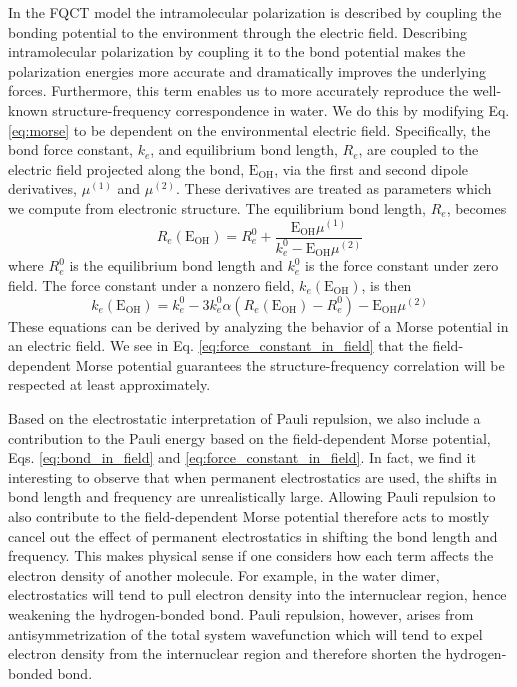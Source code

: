 \documentclass[journal=jctcce,manuscript=article]{achemso}
\begin{document}
In the FQCT model the intramolecular polarization is described by coupling the bonding potential to the environment through the electric field. Describing intramolecular polarization by coupling it to the bond potential makes the polarization energies more accurate and dramatically improves the underlying forces. Furthermore, this term enables us to more accurately reproduce the well-known structure-frequency correspondence in water.\cite{boyer2019beyond} We do this by modifying Eq. \ref{eq:morse} to be dependent on the environmental electric field. Specifically, the bond force constant, $k_e$, and equilibrium bond length, $R_e$, are coupled to the electric field projected along the bond, $\mathrm{E_{OH}}$, via the first and second dipole derivatives, $\mu^{(1)}$ and $\mu^{(2)}$. These derivatives are treated as parameters which we compute from electronic structure. The equilibrium bond length, $R_e$, becomes
\begin{equation}
  R_e(\mathrm{E_{OH}})=R_e^0+ \frac{\mathrm{E_{OH}}\mu^{(1)}}{k_e^0-\mathrm{E_{OH}}\mu^{(2)}}
  \label{eq:bond_in_field}
\end{equation}
where $R_e^0$ is the equilibrium bond length and $k_e^0$ is the force constant under zero field. The force constant under a nonzero field, $k_e(\mathrm{E_{OH}})$, is then
\begin{equation}
  k_e(\mathrm{E_{OH}})=k_e^0-3k_e^0\alpha\left(R_e(\mathrm{E_{OH}})-R_e^0\right)-\mathrm{E_{OH}}\mu^{(2)}
  \label{eq:force_constant_in_field}
\end{equation}
These equations can be derived by analyzing the behavior of a Morse potential in an electric field.\cite{boyer2019beyond} We see in Eq. \ref{eq:force_constant_in_field} that the field-dependent Morse potential guarantees the structure-frequency correlation will be respected at least approximately.

Based on the electrostatic interpretation of Pauli repulsion, we also include a contribution to the Pauli energy based on the field-dependent Morse potential, Eqs. \ref{eq:bond_in_field} and \ref{eq:force_constant_in_field}. In fact, we find it interesting to observe that when permanent electrostatics are used, the shifts in bond length and frequency are unrealistically large. Allowing Pauli repulsion to also contribute to the field-dependent Morse potential therefore acts to mostly cancel out the effect of permanent electrostatics in shifting the bond length and frequency. This makes physical sense if one considers how each term affects the electron density of another molecule. For example, in the water dimer, electrostatics will tend to pull electron density into the internuclear region, hence weakening the hydrogen-bonded  bond. Pauli repulsion, however, arises from antisymmetrization of the total system wavefunction which will tend to expel electron density from the internuclear region and therefore shorten the hydrogen-bonded  bond.
\end{document}
